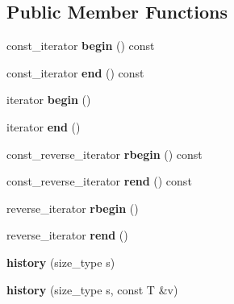 \subsection*{Public Member Functions}
\begin{DoxyCompactItemize}
\item 
const\+\_\+iterator {\bfseries begin} () const \hypertarget{classhistory_aa05438a780781b1cb1c0781e1826db72}{}\label{classhistory_aa05438a780781b1cb1c0781e1826db72}

\item 
const\+\_\+iterator {\bfseries end} () const \hypertarget{classhistory_a4c5651e3aec4194efaafb20098fb701d}{}\label{classhistory_a4c5651e3aec4194efaafb20098fb701d}

\item 
iterator {\bfseries begin} ()\hypertarget{classhistory_a187179b376b9d6bf3e7388edbfc1f4a2}{}\label{classhistory_a187179b376b9d6bf3e7388edbfc1f4a2}

\item 
iterator {\bfseries end} ()\hypertarget{classhistory_ab3389a995df4b505c8f1c8c379df66c4}{}\label{classhistory_ab3389a995df4b505c8f1c8c379df66c4}

\item 
const\+\_\+reverse\+\_\+iterator {\bfseries rbegin} () const \hypertarget{classhistory_af92807c67b64691249f541f19828da60}{}\label{classhistory_af92807c67b64691249f541f19828da60}

\item 
const\+\_\+reverse\+\_\+iterator {\bfseries rend} () const \hypertarget{classhistory_a6ebe5d6195d4a5b83a6928c90606eae5}{}\label{classhistory_a6ebe5d6195d4a5b83a6928c90606eae5}

\item 
reverse\+\_\+iterator {\bfseries rbegin} ()\hypertarget{classhistory_ab78fd92fb7f654390366085386b34d30}{}\label{classhistory_ab78fd92fb7f654390366085386b34d30}

\item 
reverse\+\_\+iterator {\bfseries rend} ()\hypertarget{classhistory_a4081dae36c347533fa7b2207003f0411}{}\label{classhistory_a4081dae36c347533fa7b2207003f0411}

\item 
{\bfseries history} (size\+\_\+type s)\hypertarget{classhistory_a9e3b1459bfe8affc068254d5326ac16a}{}\label{classhistory_a9e3b1459bfe8affc068254d5326ac16a}

\item 
{\bfseries history} (size\+\_\+type s, const T \&v)\hypertarget{classhistory_ae8aaa2e9c295a1a20e1093276e2bcb8f}{}\label{classhistory_ae8aaa2e9c295a1a20e1093276e2bcb8f}


\end{DoxyCompactItemize}
